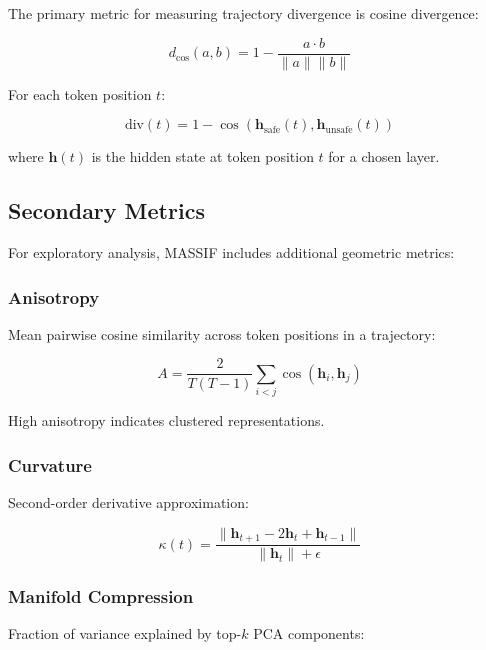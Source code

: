 \documentclass[12pt,a4paper]{article}
\begin{document}
The primary metric for measuring trajectory divergence is cosine divergence:

\begin{equation}
d_{\text{cos}}(a,b) = 1 - \frac{a \cdot b}{\|a\| \|b\|}
\end{equation}

For each token position \(t\):

\begin{equation}
\text{div}(t) = 1 - \cos(\mathbf{h}_{\text{safe}}(t), \mathbf{h}_{\text{unsafe}}(t))
\end{equation}

where \(\mathbf{h}(t)\) is the hidden state at token position \(t\) for a chosen layer.

\subsection{Secondary Metrics}

For exploratory analysis, MASSIF includes additional geometric metrics:

\subsubsection*{Anisotropy}

Mean pairwise cosine similarity across token positions in a trajectory:

\begin{equation}
A = \frac{2}{T(T-1)} \sum_{i<j} \cos(\mathbf{h}_i, \mathbf{h}_j)
\end{equation}

High anisotropy indicates clustered representations.

\subsubsection*{Curvature}

Second-order derivative approximation:

\begin{equation}
\kappa(t) = \frac{\|\mathbf{h}_{t+1} - 2\mathbf{h}_t + \mathbf{h}_{t-1}\|}{\|\mathbf{h}_t\| + \epsilon}
\end{equation}

\subsubsection*{Manifold Compression}

Fraction of variance explained by top-\(k\) PCA components:
\end{document}

